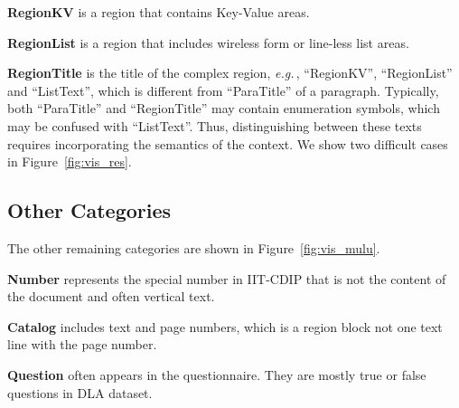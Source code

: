 \documentclass[10pt,twocolumn,letterpaper]{article}
\def\eg{\emph{e.g.}\,}
\begin{document}
\noindent
\textbf{RegionKV} is a region that contains Key-Value areas.

\noindent
\textbf{RegionList} is a region that includes wireless form or line-less list areas.

\noindent
\textbf{RegionTitle} is the title of the complex region, \eg, ``RegionKV'', ``RegionList'' and ``ListText'',
which is different from ``ParaTitle'' of a paragraph.
Typically, both ``ParaTitle'' and ``RegionTitle'' may contain enumeration symbols, which may be confused with ``ListText''.
Thus, distinguishing between these texts requires incorporating the semantics of the context.
We show two difficult cases in Figure~\ref{fig:vis_res}.

\subsection{Other Categories} 
The other remaining categories are shown in Figure~\ref{fig:vis_mulu}.

\noindent
\textbf{Number} represents the special number in IIT-CDIP that is not the content of the document and often vertical text.

\noindent
\textbf{Catalog} includes text and page numbers, which is a region block not one text line with the page number.

\noindent
\textbf{Question} often appears in the questionnaire. They are mostly true or false questions in DLA dataset.
\end{document}
